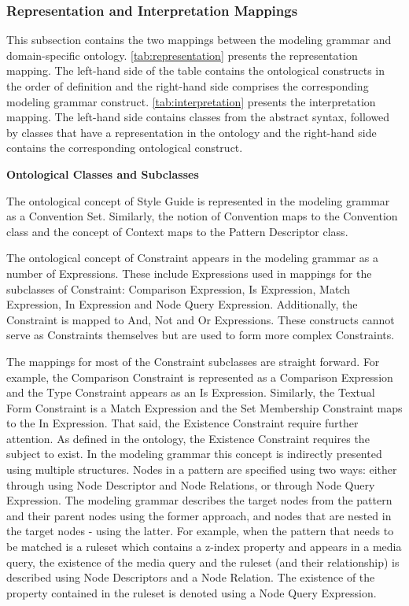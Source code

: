 \subsubsection{Representation and Interpretation Mappings} 

This subsection contains the two mappings between the modeling grammar and domain-specific ontology.
\autoref{tab:representation} presents the representation mapping. The left-hand side of the table
contains the ontological constructs in the order of definition and the right-hand side comprises the
corresponding modeling grammar construct. \autoref{tab:interpretation} presents the interpretation
mapping. The left-hand side contains classes from the abstract syntax, followed by classes that have
a representation in the ontology and the right-hand side contains the corresponding ontological
construct.





\textbf{Ontological Classes and Subclasses}

The ontological concept of Style Guide is represented in the modeling grammar
as a Convention Set. Similarly, the notion of Convention maps to the
Convention class and the concept of Context maps to the Pattern Descriptor
class.

The ontological concept of Constraint appears in the modeling grammar as a
number of Expressions. These include Expressions used in mappings for the
subclasses of Constraint: Comparison Expression, Is Expression, Match
Expression, In Expression and Node Query Expression. Additionally, the
Constraint is mapped to And, Not and Or Expressions. These constructs cannot
serve as Constraints themselves but are used to form more complex Constraints.

The mappings for most of the Constraint subclasses are straight forward. For
example, the Comparison Constraint is represented as a Comparison Expression
and the Type Constraint appears as an Is Expression. Similarly, the Textual
Form Constraint is a Match Expression and the Set Membership Constraint maps
to the In Expression. That said, the Existence Constraint require further
attention. As defined in the ontology, the Existence Constraint requires the
subject to exist. In the modeling grammar this concept is indirectly presented
using multiple structures. Nodes in a pattern are specified using two ways:
either through using Node Descriptor and Node Relations, or through Node Query
Expression. The modeling grammar describes the target nodes from the pattern
and their parent nodes using the former approach, and nodes that are nested in
the target nodes - using the latter. For example, when the pattern that
needs to be matched is a ruleset which contains a z-index property and appears
in a media query, the existence of the media query and the ruleset (and their
relationship) is described using Node Descriptors and a Node Relation. The
existence of the property contained in the ruleset is denoted using a Node
Query Expression.

